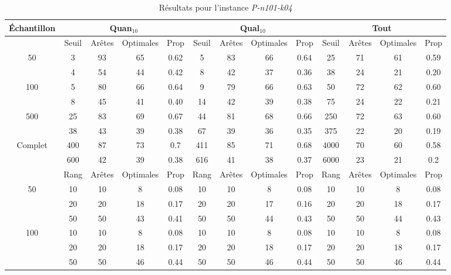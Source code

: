 \documentclass[a4paper,11pt]{article}%
\begin{document}
\begin{table}[p]
\caption{Résultats pour l'instance \emph{P-n101-k04}}
\label{T3}
\begin{center}
\begin{tabular}{|@{}c@{}|@{}c@{}|@{}c@{}|@{}c@{}|@{}c@{}||@{}c@{}|@{}c@{}|@{}c@{}|@{}c@{}||@{}c@{}|@{}c@{}|@{}c@{}|@{}c@{}|}

\hline
 Échantillon & \multicolumn{4}{c|}{Quan$_{10}$} & \multicolumn{4}{c|}{Qual$_{10}$} & \multicolumn{4}{c|}{Tout} \\
 \hline
 & Seuil & Arêtes & Optimales & Prop & Seuil & Arêtes & Optimales & Prop & Seuil & Arêtes & Optimales & Prop \\
 \hline
 50 & 3 & 93 & 65 & 0.62 & 5 & 83 & 66 & 0.64 & 25 & 71 & 61 & 0.59 \\
 \cline{2-13} 
    & 4 & 54 & 44 & 0.42 & 8 & 42 & 37 & 0.36 & 38 & 24 & 21 & 0.20  \\
  \hline
   100 & 5 & 80 & 66 & 0.64 & 9 & 79 & 66 & 0.63 & 50 & 72 & 62 & 0.60 \\
 \cline{2-13} 
    & 8 & 45 & 41 & 0.40 & 14 & 42 & 39 & 0.38 & 75 & 24 & 22 & 0.21 \\
  \hline
   500 & 25 & 83 & 69 & 0.67 & 44 & 81 & 68 & 0.66 & 250 & 72 & 63 & 0.60 \\
 \cline{2-13} 
    & 38 & 43 & 39 & 0.38 & 67 & 39 & 36 & 0.35 & 375 & 22 & 20 & 0.19 \\
  \hline
   Complet & 400 & 87 & 73 & 0.7 & 411 & 85 & 71 & 0.68 & 4000 & 70 & 60 & 0.58 \\
 \cline{2-13} 
    & 600 & 42 & 39 & 0.38 & 616 & 41 & 38 & 0.37 & 6000 & 23 & 21 & 0.2 \\
  \hline
 & Rang& Arêtes & Optimales & Prop & Rang& Arêtes & Optimales & Prop & Rang& Arêtes & Optimales & Prop \\
 \hline
 50 & 10& 10 & 8 & 0.08 & 10& 10 & 8 & 0.08 & 10& 10 & 8 & 0.08 \\
 \cline{2-13} 
    & 20&20 & 18 & 0.17 & 20& 20 & 17 & 0.16 & 20& 20& 18 & 0.17  \\
 \cline{2-13} 
    & 50& 50& 43 & 0.41 & 50& 50& 44 & 0.43 & 50&50 & 44 & 0.43  \\
  \hline
   100 & 10& 10 & 8 & 0.08 & 10& 10 & 8 & 0.08 & 10& 10 & 8 & 0.08  \\
 \cline{2-13} 
    & 20&20 & 18 & 0.17 & 20&20 & 18 & 0.17 & 20&20 & 18 & 0.17  \\
  \cline{2-13} 
    & 50&50 & 46 & 0.44 & 50&50 & 46 & 0.44 & 50&50 & 46 & 0.44  \\

\end{tabular}
\end{center}
\end{table}
\end{document}
